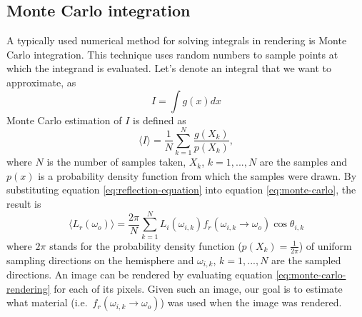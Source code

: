     \subsection{Monte Carlo integration}
    A typically used numerical method for solving integrals in rendering is Monte Carlo integration. This technique uses random numbers to sample points at which the integrand is evaluated. Let's denote an integral that we want to approximate, as
    \begin{equation}
        I = \int g(x) dx
    \end{equation}
    Monte Carlo estimation of $I$ is defined as
    \begin{equation}
        \label{eq:monte-carlo}
        \langle I \rangle = \frac{1}{N}\sum_{k = 1}^N \frac{g(X_k)}{p(X_k)},
    \end{equation}
    where $N$ is the number of samples taken, $X_k$, $k=1,...,N$ are the samples and $p(x)$ is a probability density function from which the samples were drawn.
    \newline
    By substituting equation \ref{eq:reflection-equation} into equation \ref{eq:monte-carlo}, the result is
    \begin{equation}
         \langle L_r(\omega_o) \rangle = \frac{2\pi}{N} \sum_{k = 1}^N L_i(\omega_{i, k})f_r(\omega_{i, k} \to \omega_o) \cos \theta_{i, k}
         \label{eq:monte-carlo-rendering}
    \end{equation}
    where $2\pi$ stands for the probability density function ($p(X_k) = \frac{1}{2\pi}$) of uniform sampling directions on the hemisphere and $\omega_{i, k}$, $k=1,...,N$ are the sampled directions.
    \newline
    An image can be rendered by evaluating equation \ref{eq:monte-carlo-rendering} for each of its pixels. Given such an image, our goal is to estimate what material (i.e.\ $f_r(\omega_{i, k} \to \omega_o)$) was used when the image was rendered. 
